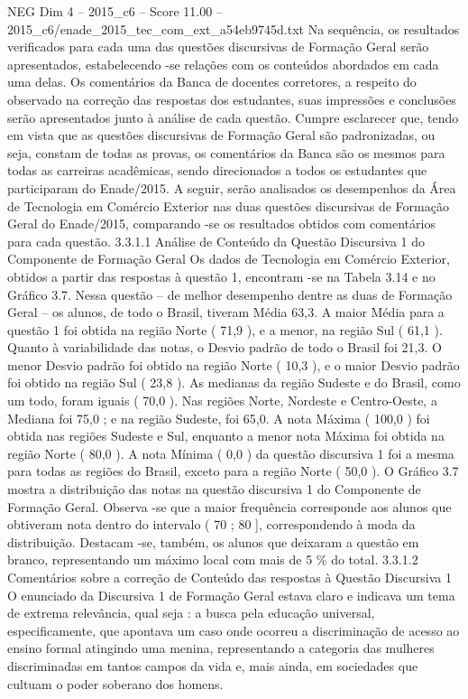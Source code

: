 \begin{textsample}{NEG Dim 4 – 2015\_c6 – Score 11.00 – 2015\_c6/enade\_2015\_tec\_com\_ext\_a54eb9745d.txt}
Na sequência, os resultados verificados para cada uma das questões discursivas de Formação Geral serão apresentados, estabelecendo -se relações com os conteúdos abordados em cada uma delas.
Os comentários da Banca de docentes corretores, a respeito do observado na correção das respostas dos estudantes, suas impressões e conclusões serão apresentados junto à análise de cada questão.
Cumpre esclarecer que, tendo em vista que as questões discursivas de Formação Geral são padronizadas, ou seja, constam de todas as provas, os comentários da Banca são os mesmos para todas as carreiras acadêmicas, sendo direcionados a todos os estudantes que participaram do Enade/2015.
A seguir, serão analisados os desempenhos da Área de Tecnologia em Comércio Exterior nas duas questões discursivas de Formação Geral do Enade/2015, comparando -se os resultados obtidos com comentários para cada questão. 3.3.1.1 Análise de Conteúdo da Questão Discursiva 1 do Componente de Formação Geral Os dados de Tecnologia em Comércio Exterior, obtidos a partir das respostas à questão 1, encontram -se na Tabela 3.14 e no Gráfico 3.7.
Nessa questão – de melhor desempenho dentre as duas de Formação Geral – os alunos, de todo o Brasil, tiveram Média 63,3.
A maior Média para a questão 1 foi obtida na região Norte ( 71,9 ), e a menor, na região Sul ( 61,1 ).
Quanto à variabilidade das notas, o Desvio padrão de todo o Brasil foi 21,3.
O menor Desvio padrão foi obtido na região Norte ( 10,3 ), e o maior Desvio padrão foi obtido na região Sul ( 23,8 ).
As medianas da região Sudeste e do Brasil, como um todo, foram iguais ( 70,0 ).
Nas regiões Norte, Nordeste e Centro-Oeste, a Mediana foi 75,0 ; e na região Sudeste, foi 65,0.
A nota Máxima ( 100,0 ) foi obtida nas regiões Sudeste e Sul, enquanto a menor nota Máxima foi obtida na região Norte ( 80,0 ).
A nota Mínima ( 0,0 ) da questão discursiva 1 foi a mesma para todas as regiões do Brasil, exceto para a região Norte ( 50,0 ).
O Gráfico 3.7 mostra a distribuição das notas na questão discursiva 1 do Componente de Formação Geral.
Observa -se que a maior frequência corresponde aos alunos que obtiveram nota dentro do intervalo ( 70 ; 80 ], correspondendo à moda da distribuição.
Destacam -se, também, os alunos que deixaram a questão em branco, representando um máximo local com mais de 5 \% do total. 3.3.1.2 Comentários sobre a correção de Conteúdo das respostas à Questão Discursiva 1 O enunciado da Discursiva 1 de Formação Geral estava claro e indicava um tema de extrema relevância, qual seja : a busca pela educação universal, especificamente, que apontava um caso onde ocorreu a discriminação de acesso ao ensino formal atingindo uma menina, representando a categoria das mulheres discriminadas em tantos campos da vida e, mais ainda, em sociedades que cultuam o poder soberano dos homens.

\end{textsample}
